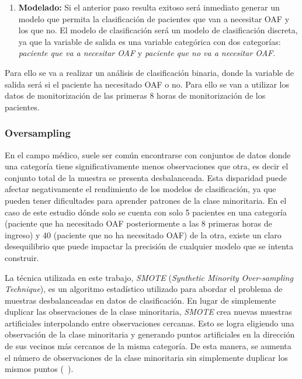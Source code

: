 \begin{enumerate}
    \item \textbf{Modelado:} Si el anterior paso resulta exitoso será inmediato generar un modelo que permita la clasificación de pacientes que van a necesitar OAF y los que no. El modelo de clasificación será un modelo de clasificación discreta, ya que la variable de salida es una variable categórica con dos categorías: \textit{paciente que va a necesitar OAF} y \textit{paciente que no va a necesitar OAF}. 
\end{enumerate}


Para ello se va a realizar un análisis de clasificación binaria, donde la variable de salida será si el paciente ha necesitado OAF o no. Para ello se van a utilizar los datos de monitorización de las primeras $8$ horas de monitorización de los pacientes.











\subsubsection{Oversampling}\label{sec:oversampling}

En el campo médico, suele ser común encontrarse con conjuntos de datos donde una categoría tiene significativamente menos observaciones que otra, es decir el conjunto total de la muestra se presenta desbalanceada. Esta disparidad puede afectar negativamente el rendimiento de los modelos de clasificación, ya que pueden tener dificultades para aprender patrones de la clase minoritaria. En el caso de este estudio dónde solo se cuenta con solo 5 pacientes en una categoría (paciente que ha necesitado OAF posteriormente a las $8$ primeras horas de ingreso) y 40 (paciente que no ha necesitado OAF) de la  otra, existe un claro desequilibrio que puede impactar la precisión de cualquier modelo que se intenta construir.

La técnica utilizada en este trabajo, \textit{SMOTE} (\textit{Synthetic Minority Over-sampling Technique}), es un algoritmo estadístico utilizado para abordar el problema de muestras desbalanceadas en datos de clasificación. En lugar de simplemente duplicar las observaciones de la clase minoritaria, \textit{SMOTE} crea nuevas muestras artificiales interpolando entre observaciones cercanas. Esto se logra eligiendo una observación de la clase minoritaria y generando puntos artificiales en la dirección de sus vecinos más cercanos de la misma categoría. De esta manera, se aumenta el número de observaciones de la clase minoritaria sin simplemente duplicar los mismos puntos (~\cite{Chawla2002}).
\newpage


\newpage



\newpage